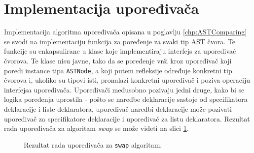 \section{Implementacija upoređivača}
\label{sec:ImplementationComparer}

Implementacija algoritma upoređivača opisana u poglavlju \ref{chp:ASTComparing} se svodi na implementaciju funkcija za poređenje za svaki tip AST čvora. Te funkcije su enkapsulirane u klase koje implementiraju interfejs za upoređivač čvorova. Te klase nisu javne, tako da se poređenje vrši kroz upoređivač koji poredi instance tipa \texttt{ASTNode}, a koji putem refleksije određuje konkretni tip čvorova i, ukoliko su tipovi isti, pronalazi konkretni upoređivač i poziva operaciju interfejsa upoređivača. Upoređivači međusobno pozivaju jedni druge, kako bi se logika poređenja uprostila - pošto se naredbe deklaracije sastoje od specifikatora deklaracije i liste deklaratora, upoređivač naredbi deklaracije može pozivati upoređivač za specifikatore deklaracije i upoređivač za listu deklaratora. Rezultat rada upoređivača za algoritam \emph{swap} se može videti na slici \ref{fig:ComparerSwap}.

\begin{figure}[h!]
\centering
\caption{Rezultat rada upoređivača za \texttt{swap} algoritam.}
\label{fig:ComparerSwap}
\end{figure}

